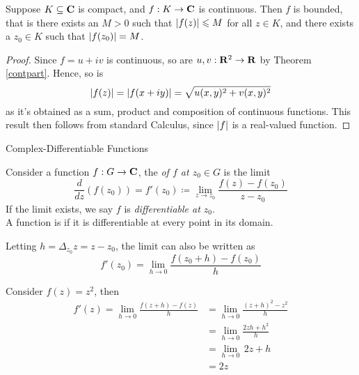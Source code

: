 \begin{theorem}
Suppose $K \subseteq \mathbf C$ is compact, and $f: K \to \mathbf C$ is continuous. Then $f$ is bounded, that is there exists an $M > 0$ such that $\left\lvert f(z)\right\rvert \leqslant M$ for all $z \in K$, and there exists a $z_0 \in K$ such that $\left\lvert f(z_0)\right\rvert = M$.
\end{theorem}
\begin{proof}
Since $f = u + iv$ is continuous, so are $u,v:\mathbf R^2 \to \mathbf R$ by Theorem \ref{contpart}.  Hence, so is
\[\left\lvert f(z)\right\rvert = \left\lvert f(x + iy)\right\rvert = \sqrt{u(x,y)^2 + v(x,y)^2}\]
as it's obtained as a sum, product and composition of continuous functions. This result then follows from standard Calculus, since $\left\lvert f\right\rvert$ is a real-valued function.
\end{proof}

\vspace*{2em}

\begin{mdframed}
\begin{center}
{\Large Complex-Differentiable Functions}
\end{center}
\end{mdframed}

\begin{definition}[Derivative]\label{cmplxder}
Consider a function $f:G \to \mathbf C$, the  \emph{of $f$ at $z_0 \in G$} is the limit
\[\frac{d}{dz}(f(z_0)) = f'(z_0) \coloneqq \lim_{z \to z_0}\frac{f(z) - f(z_0)}{z - z_0}\]
If the limit exists, we say $f$ is \emph{differentiable at $z_0$}.\\[0.5em]
A function is  if it is differentiable at every point in its domain.
\end{definition}
Letting $h = \Delta_{z_0}z = z - z_0$, the limit can also be written as
\[f'(z_0) = \lim_{h \to 0}\frac{f(z_0 + h) - f(z_0)}{h}\]

\vspace*{1em}

\begin{example}
Consider $f(z) = z^2$, then
\begin{align*}
f'(z) = \lim_{h \to 0}\frac{f(z + h) - f(z)}{h} &= \lim_{h \to 0}\frac{(z + h)^2 - z^2}{h}\\[0.5em]
&= \lim_{h \to 0}\frac{2zh + h^2}{h}\\[0.5em]
&= \lim_{h \to 0}\,2z + h\\[0.5em]
&= 2z
\end{align*}
\end{example}

